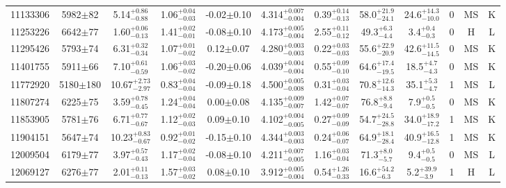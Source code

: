 \begin{landscape}
\begin{longtable}{c|ccccc|ccc|ccc}
	11133306 & 5982$\pm$82   & 5.14$_{-0.88}^{+0.86}$    & 1.06$_{-0.03}^{+0.04}$ & -0.02$\pm$0.10    & 4.314$_{-0.004}^{+0.007}$ & 0.39$_{-0.13}^{+0.14}$ & 58.0$_{-24.1}^{+21.9}$    & 24.6$_{-10.0}^{+14.3}$   & 0 &        MS & K \\
	11253226 & 6642$\pm$77   & 1.60$_{-0.13}^{+0.06}$    & 1.41$_{-0.01}^{+0.02}$ & -0.08$\pm$0.10    & 4.173$_{-0.004}^{+0.005}$ & 2.55$_{-0.12}^{+0.11}$ & 49.3$_{-4.4}^{+6.3}$      & 3.4$_{-0.3}^{+0.4}$      & 0 &        H & L \\
	11295426 & 5793$\pm$74   & 6.31$_{-0.34}^{+0.32}$    & 1.07$_{-0.02}^{+0.01}$ & 0.12$\pm$0.07     & 4.280$_{-0.003}^{+0.003}$ & 0.22$_{-0.03}^{+0.03}$ & 55.6$_{-20.9}^{+22.9}$    & 42.6$_{-14.5}^{+11.5}$   & 0 &        MS & K \\
	11401755 & 5911$\pm$66   & 7.10$_{-0.59}^{+0.61}$    & 1.06$_{-0.02}^{+0.03}$ & -0.20$\pm$0.06    & 4.039$_{-0.004}^{+0.004}$ & 0.55$_{-0.10}^{+0.09}$ & 64.6$_{-19.5}^{+17.4}$    & 18.5$_{-4.3}^{+4.7}$     & 0 &        MS & K \\
	11772920 & 5180$\pm$180  & 10.67$_{-2.97}^{+2.73}$   & 0.83$_{-0.04}^{+0.04}$ & -0.09$\pm$0.18    & 4.500$_{-0.008}^{+0.005}$ & 0.31$_{-0.04}^{+0.03}$ & 70.8$_{-14.3}^{+12.6}$    & 35.1$_{-4.7}^{+5.3}$     & 1 &        MS & L \\
	11807274 & 6225$\pm$75   & 3.59$_{-0.45}^{+0.78}$    & 1.24$_{-0.04}^{+0.04}$ & 0.00$\pm$0.08     & 4.135$_{-0.007}^{+0.009}$ & 1.42$_{-0.07}^{+0.07}$ & 76.8$_{-9.4}^{+8.8}$      & 7.9$_{-0.5}^{+0.5}$      & 0 &        MS & K \\
	11853905 & 5781$\pm$76   & 6.71$_{-0.67}^{+0.77}$    & 1.12$_{-0.03}^{+0.02}$ & 0.09$\pm$0.10     & 4.102$_{-0.005}^{+0.004}$ & 0.27$_{-0.09}^{+0.09}$ & 54.7$_{-28.8}^{+24.5}$    & 34.0$_{-17.2}^{+18.9}$   & 1 &        MS & K \\
	11904151 & 5647$\pm$74   & 10.23$_{-0.67}^{+0.83}$   & 0.92$_{-0.02}^{+0.01}$ & -0.15$\pm$0.10    & 4.344$_{-0.003}^{+0.003}$ & 0.24$_{-0.07}^{+0.06}$ & 64.9$_{-28.4}^{+18.1}$    & 40.9$_{-12.8}^{+16.5}$   & 1 &        MS & K \\
	12009504 & 6179$\pm$77   & 3.97$_{-0.43}^{+0.57}$    & 1.17$_{-0.04}^{+0.02}$ & -0.08$\pm$0.10    & 4.211$_{-0.005}^{+0.007}$ & 1.16$_{-0.04}^{+0.03}$ & 71.3$_{-5.7}^{+8.0}$      & 9.4$_{-0.5}^{+0.5}$      & 0 &        MS & L \\
	12069127 & 6276$\pm$77   & 2.01$_{-0.13}^{+0.11}$    & 1.57$_{-0.02}^{+0.03}$ & 0.08$\pm$0.10     & 3.912$_{-0.004}^{+0.005}$ & 0.54$_{-0.33}^{+1.26}$ & 16.6$_{-6.3}^{+54.2}$     & 5.2$_{-3.9}^{+39.9}$     & 1 &        H & L \\

\end{longtable}
\end{landscape}
